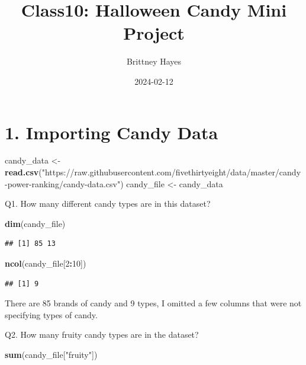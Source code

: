 \documentclass[
]{article}
\title{Class10: Halloween Candy Mini Project}
\author{Brittney Hayes}
\date{2024-02-12}
\newenvironment{Shaded}{\begin{snugshade}}{\end{snugshade}}
\newcommand{\DecValTok}[1]{\textcolor[rgb]{0.00,0.00,0.81}{#1}}
\newcommand{\FunctionTok}[1]{\textcolor[rgb]{0.13,0.29,0.53}{\textbf{#1}}}
\newcommand{\NormalTok}[1]{#1}
\newcommand{\OtherTok}[1]{\textcolor[rgb]{0.56,0.35,0.01}{#1}}
\newcommand{\SpecialCharTok}[1]{\textcolor[rgb]{0.81,0.36,0.00}{\textbf{#1}}}
\newcommand{\StringTok}[1]{\textcolor[rgb]{0.31,0.60,0.02}{#1}}
\begin{document}
\maketitle

\hypertarget{importing-candy-data}{%
\section{1. Importing Candy Data}\label{importing-candy-data}}

\begin{Shaded}
\begin{Highlighting}[]
\NormalTok{candy\_data }\OtherTok{\textless{}{-}} \FunctionTok{read.csv}\NormalTok{(}\StringTok{"https://raw.githubusercontent.com/fivethirtyeight/data/master/candy{-}power{-}ranking/candy{-}data.csv"}\NormalTok{) }
\NormalTok{candy\_file }\OtherTok{\textless{}{-}}\NormalTok{ candy\_data}
\end{Highlighting}
\end{Shaded}

Q1. How many different candy types are in this dataset?

\begin{Shaded}
\begin{Highlighting}[]
\FunctionTok{dim}\NormalTok{(candy\_file)}
\end{Highlighting}
\end{Shaded}

\begin{verbatim}
## [1] 85 13
\end{verbatim}

\begin{Shaded}
\begin{Highlighting}[]
\FunctionTok{ncol}\NormalTok{(candy\_file[}\DecValTok{2}\SpecialCharTok{:}\DecValTok{10}\NormalTok{])}
\end{Highlighting}
\end{Shaded}

\begin{verbatim}
## [1] 9
\end{verbatim}

There are 85 brands of candy and 9 types, I omitted a few columns that
were not specifying types of candy.

Q2. How many fruity candy types are in the dataset?

\begin{Shaded}
\begin{Highlighting}[]
\FunctionTok{sum}\NormalTok{(candy\_file[}\StringTok{"fruity"}\NormalTok{])}
\end{Highlighting}
\end{Shaded}
\end{document}
